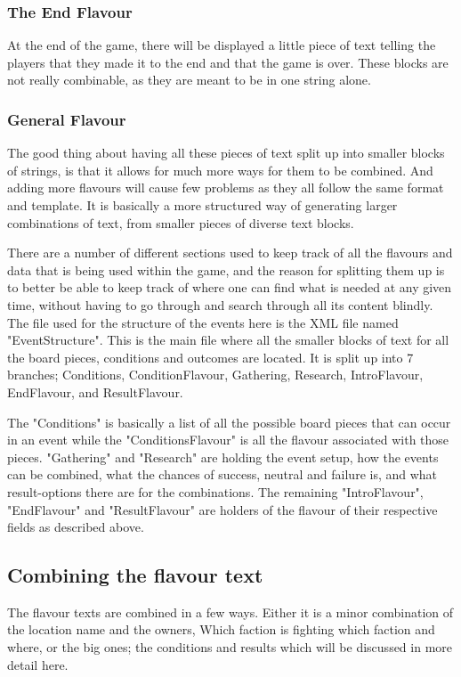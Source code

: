 \subsubsection{The End Flavour}
At the end of the game, there will be displayed a little piece of text telling the players that they made it to the end and that the game is over. These blocks are not really combinable, as they are meant to be in one string alone.

\subsubsection{General Flavour}
The good thing about having all these pieces of text split up into smaller blocks of strings, is that it allows for much more ways for them to be combined. And adding more flavours will cause few problems as they all follow the same format and template. It is basically a more structured way of generating larger combinations of text, from smaller pieces of diverse text blocks.

There are a number of different sections used to keep track of all the flavours and data that is being used within the game, and the reason for splitting them up is to better be able to keep track of where one can find what is needed at any given time, without having to go through and search through all its content blindly.
The file used for the structure of the events here is the XML file named "EventStructure". This is the main file where all the smaller blocks of text for all the board pieces, conditions and outcomes are located. It is split up into 7 branches; Conditions, ConditionFlavour, Gathering, Research, IntroFlavour, EndFlavour, and ResultFlavour.

The "Conditions" is basically a list of all the possible board pieces that can occur in an event while the "ConditionsFlavour" is all the flavour associated with those pieces.
"Gathering" and "Research" are holding the event setup, how the events can be combined, what the chances of success, neutral and failure is, and what result-options there are for the combinations.
The remaining "IntroFlavour", "EndFlavour" and "ResultFlavour" are holders of the flavour of their respective fields as described above.

\subsection{Combining the flavour text}
The flavour texts are combined in a few ways. Either it is a minor combination of the location name and the owners, Which faction is fighting which faction and where, or the big ones; the conditions and results which will be discussed in more detail here.
